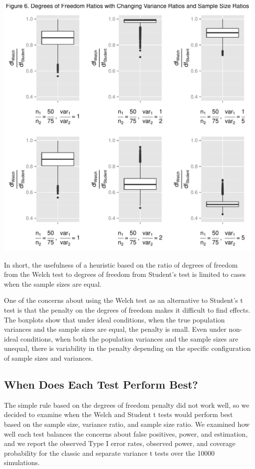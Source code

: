\documentclass[man,a4paper,noextraspace]{apa6}\usepackage[]{graphicx}\usepackage[]{color}
\makeatletter
\def\maxwidth{ %
  \ifdim\Gin@nat@width>\linewidth
    \linewidth
  \else
    \Gin@nat@width
  \fi
}
\newenvironment{knitrout}{}{} %
\makeatother
\begin{document}
\begin{knitrout}
\color{fgcolor}
\includegraphics[width=\maxwidth]{figure/dfratiosDiffvarsDiffNratios} 

\end{knitrout}

    In short, the usefulness of a heuristic based on the ratio of degrees of freedom from the Welch test to degrees of freedom from Student's test is limited to cases when the sample sizes are equal. 

    One of the concerns about using the Welch test as an alternative to Student's t test is that the penalty on the degrees of freedom makes it difficult to find effects. The boxplots show that under ideal conditions, when the true population variances and the sample sizes are equal, the penalty is small. Even under non-ideal conditions, when both the population variances and the sample sizes are unequal, there is variability in the penalty depending on the specific configuration of sample sizes and variances.

\subsection{When Does Each Test Perform Best?}
    The simple rule based on the degrees of freedom penalty did not work well, so we decided to examine when the Welch and Student t tests would perform best based on the sample size, variance ratio, and sample size ratio. We examined how well each test balances the concerns about false positives, power, and estimation, and we report the observed Type I error rates, observed power, and coverage probability for the classic and separate variance t tests over the 10000 simulations.
\end{document}
